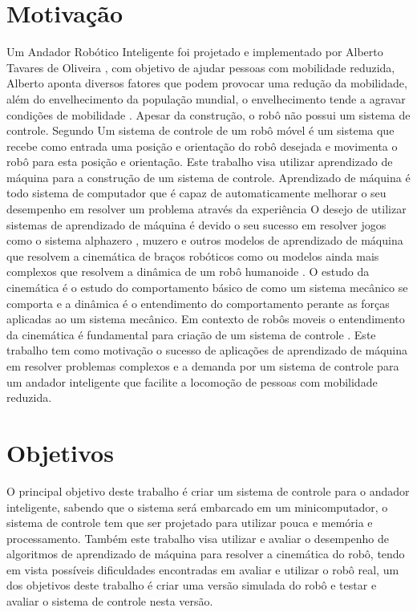 \label{Cap:Introducao}

\section{Motivação}

Um Andador Robótico Inteligente foi projetado e implementado
por Alberto Tavares de Oliveira \cite{oliveira2022projeto},
com objetivo de ajudar pessoas com mobilidade reduzida, Alberto aponta
diversos fatores que podem provocar uma redução da mobilidade, além do 
envelhecimento da população mundial, o envelhecimento tende a agravar
condições de mobilidade . Apesar da construção,
o robô não possui um sistema de controle. Segundo \cite{siegwart2011introduction}
Um sistema de controle de um robô móvel é um sistema que recebe
como entrada uma posição e orientação do robô desejada e movimenta o robô
para esta posição e orientação. Este trabalho visa utilizar
aprendizado de máquina para a construção de um sistema de controle.
Aprendizado de máquina é todo sistema de computador que é capaz de
automaticamente melhorar o seu desempenho em resolver um problema através
da experiência \cite{mitchell1990machine}
O desejo de utilizar sistemas de aprendizado de máquina é devido o seu sucesso em
resolver jogos como o sistema alphazero \cite{silver2017mastering}, muzero
\cite{schrittwieser2020mastering} e outros modelos de aprendizado de máquina
que resolvem a cinemática de braços robóticos como \cite{cavalcanti2017self}
ou modelos ainda mais complexos que resolvem a dinâmica de um robô humanoide
\cite{phaniteja2017deep}. O estudo da cinemática é o estudo do comportamento
básico de como um sistema mecânico se comporta e a dinâmica é o entendimento
do comportamento perante as forças aplicadas ao um sistema mecânico. Em contexto
de robôs moveis o entendimento da cinemática é fundamental para criação de um
sistema de controle \cite{siegwart2011introduction}. Este trabalho tem como
motivação o sucesso de aplicações de aprendizado de máquina em resolver problemas
complexos e a demanda por um sistema de controle para um andador
inteligente que facilite a locomoção de pessoas com mobilidade reduzida. 

\section{Objetivos}

O principal objetivo deste trabalho é criar um  sistema de
controle para o andador inteligente, sabendo que o sistema será
embarcado em um minicomputador, o sistema de controle tem que ser
projetado para utilizar pouca e memória e processamento.
Também este trabalho visa utilizar e avaliar o desempenho de algoritmos
de aprendizado de máquina para resolver a cinemática do robô, tendo em
vista possíveis dificuldades encontradas em avaliar e utilizar o robô real,
um dos objetivos deste trabalho é criar uma versão simulada do robô e
testar e avaliar o sistema de controle nesta versão.

